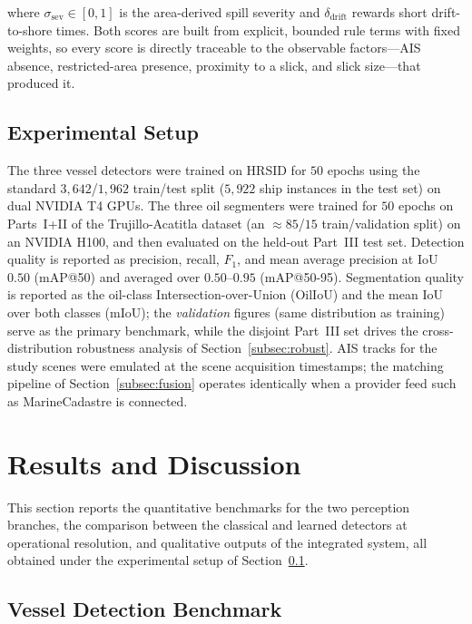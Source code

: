 \documentclass{ieeeaccess}
\begin{document}
where $\sigma_{\text{sev}}\in[0,1]$ is the area-derived spill severity and $\delta_{\text{drift}}$ rewards short drift-to-shore times. Both scores are built from explicit, bounded rule terms with fixed weights, so every score is directly traceable to the observable factors---AIS absence, restricted-area presence, proximity to a slick, and slick size---that produced it.

\subsection{Experimental Setup}
\label{subsec:setup}

The three vessel detectors were trained on HRSID for $50$ epochs using the standard $3{,}642$/$1{,}962$ train/test split ($5{,}922$ ship instances in the test set) on dual NVIDIA T4 GPUs. The three oil segmenters were trained for $50$ epochs on Parts~I+II of the Trujillo-Acatitla dataset (an $\approx85$/$15$ train/validation split) on an NVIDIA H100, and then evaluated on the held-out Part~III test set. Detection quality is reported as precision, recall, $F_1$, and mean average precision at IoU~$0.50$ (mAP@50) and averaged over $0.50$--$0.95$ (mAP@50-95). Segmentation quality is reported as the oil-class Intersection-over-Union (OilIoU) and the mean IoU over both classes (mIoU); the \emph{validation} figures (same distribution as training) serve as the primary benchmark, while the disjoint Part~III set drives the cross-distribution robustness analysis of Section~\ref{subsec:robust}. AIS tracks for the study scenes were emulated at the scene acquisition timestamps; the matching pipeline of Section~\ref{subsec:fusion} operates identically when a provider feed such as MarineCadastre is connected.

\section{Results and Discussion}
\label{sec:results}

This section reports the quantitative benchmarks for the two perception branches, the comparison between the classical and learned detectors at operational resolution, and qualitative outputs of the integrated system, all obtained under the experimental setup of Section~\ref{subsec:setup}.

\subsection{Vessel Detection Benchmark}
\end{document}
